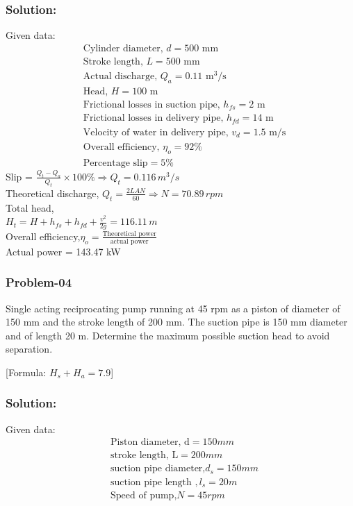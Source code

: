 \documentclass{article}
\begin{document}
\begin{multicols*}{2}
      \subsubsection*{Solution:}
      Given data: \\
      \begin{align*}
        &\text{Cylinder diameter, } d = 500 \text{ mm} \\
        &\text{Stroke length, } L = 500 \text{ mm} \\
        &\text{Actual discharge, } Q_a = 0.11 \text{ m}^3/\text{s} \\
        &\text{Head, } H = 100 \text{ m} \\
        &\text{Frictional losses in suction pipe, } h_{fs} = 2 \text{ m} \\
        &\text{Frictional losses in delivery pipe, } h_{fd} = 14 \text{ m} \\
        &\text{Velocity of water in delivery pipe, } v_d = 1.5 \text{ m/s} \\ 
        &\text{Overall efficiency, } \eta_o = 92\% \\
        &\text{Percentage slip} = 5\%  
      \end{align*}
      Slip = $\frac{Q_t - Q_a}{Q_t} \times 100\% \Rightarrow Q_t = 0.116 \, m^3/s $   \\
      Theoretical discharge, $Q_t = \frac{2LAN}{60} \Rightarrow  N = 70.89 \, rpm $  \\
      Total head, \\
      $H_t = H + h_{fs} + h_{fd} + \frac{v^2}{2g} = 116.11 \,m$ \\


      Overall efficiency,$\eta_o = \frac{\text{Theoretical power}}{\text{actual power}}$ \\
      Actual power = 143.47 kW  

      \subsubsection*{Problem-04}
      Single acting reciprocating pump running at 45 rpm as a piston of diameter of 150 mm and the stroke length of 200 mm. The suction pipe is 150 mm diameter and of length 20 m. Determine the maximum possible suction head to avoid separation. 

      [Formula: $H_s + H_a = 7.9$]

      \subsubsection*{Solution:}
      Given data:
      \begin{align*}
        &\text{Piston diameter, d} = 150 mm \\
        &\text{stroke length, L} = 200 mm \\
        &\text{suction pipe diameter,} d_s = 150 mm \\
        &\text{suction pipe length }, l_s = 20 m \\
        &\text{Speed of pump,} N = 45 rpm 
      \end{align*}


\end{multicols*}
\end{document}
